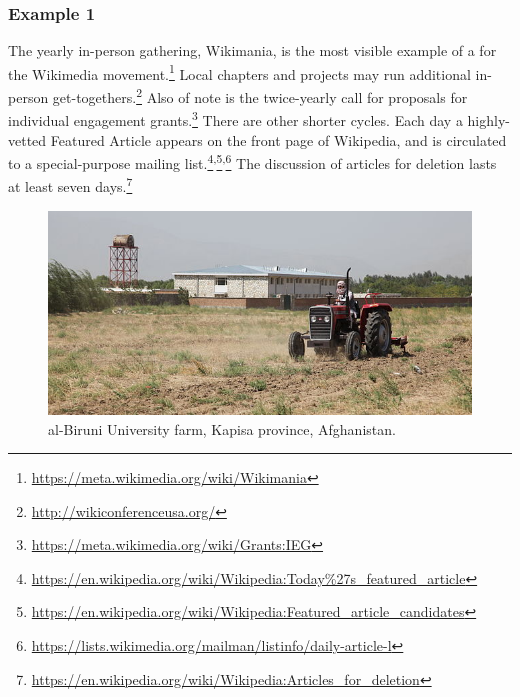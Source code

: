 \subsubsection*{Example 1} The yearly in-person gathering, Wikimania, is the most visible
example of a  for the Wikimedia
movement.\footnote{\url{https://meta.wikimedia.org/wiki/Wikimania}}
Local chapters and projects may run additional in-person
get-togethers.\footnote{\url{http://wikiconferenceusa.org/}} Also of
note is the twice-yearly call for proposals for individual engagement
grants.\footnote{\url{https://meta.wikimedia.org/wiki/Grants:IEG}}
There are other shorter cycles.  
Each day a highly-vetted Featured Article appears on the front page of Wikipedia, and is circulated to a special-purpose mailing list.\footnote{\url{https://en.wikipedia.org/wiki/Wikipedia:Today\%27s_featured_article}}\textsuperscript{,}\footnote{\url{https://en.wikipedia.org/wiki/Wikipedia:Featured_article_candidates}}\textsuperscript{,}\footnote{\url{https://lists.wikimedia.org/mailman/listinfo/daily-article-l}}
The discussion of articles for
deletion lasts at least seven days.\footnote{\url{https://en.wikipedia.org/wiki/Wikipedia:Articles_for_deletion}}


\begin{figure}[t]
\includegraphics[width=\textwidth]{kapisa.png}
\caption{al-Biruni University farm, Kapisa province, Afghanistan.
\label{farm}}
\end{figure}

